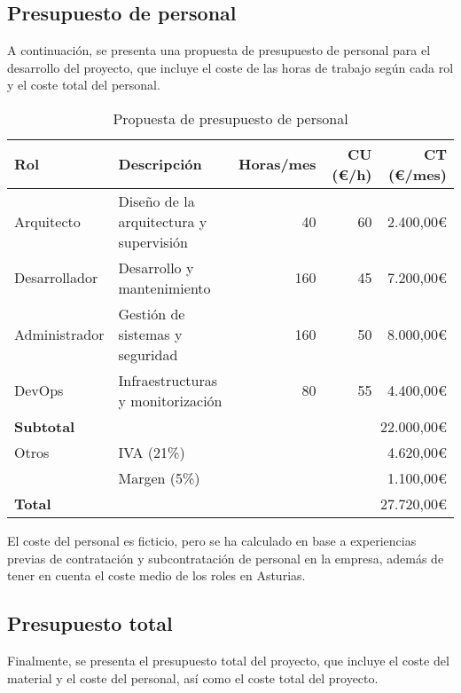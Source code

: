 \newpage{}
\subsection{Presupuesto de personal}\label{subsec:pres_personal}
A continuación, se presenta una propuesta de presupuesto de personal para el
desarrollo del proyecto, que incluye el coste de las horas de trabajo según
cada rol y el coste total del personal.

\begin{table}[H]
	\centering
	\small
	\begin{tabular}{|l|l|r|r|r|}
	\hline
	\textbf{Rol} & \textbf{Descripción} & \textbf{Horas/mes} & \textbf{CU (€/h)} & \textbf{CT (€/mes)} \\
	\hline
	\hline
	Arquitecto & Diseño de la arquitectura y supervisión & 40 & 60 & 2.400,00€ \\
	\hline
	Desarrollador & Desarrollo y mantenimiento & 160 & 45 & 7.200,00€ \\
	\hline
	Administrador & Gestión de sistemas y seguridad & 160 & 50 & 8.000,00€ \\
	\hline
	DevOps & Infraestructuras y monitorización & 80 & 55 & 4.400,00€ \\
	\hline
	\textbf{Subtotal} & \multicolumn{4}{r|}{22.000,00€} \\
	\hline
	\hline
	Otros & \multicolumn{3}{|l|}{IVA (21\%)} & 4.620,00€ \\
	 & \multicolumn{3}{|l|}{Margen (5\%)} & 1.100,00€ \\
	\hline
	\textbf{Total} & \multicolumn{4}{r|}{27.720,00€} \\
	\hline
	\end{tabular}
	\caption{Propuesta de presupuesto de personal}
	\label{tab:presupuesto_personal_aws}
\end{table}

El coste del personal es ficticio, pero se ha calculado en base a experiencias
previas de contratación y subcontratación de personal en la empresa, además de
tener en cuenta el coste medio de los roles en Asturias.

\subsection{Presupuesto total}\label{subsec:pres_total}
Finalmente, se presenta el presupuesto total del proyecto, que incluye el coste
del material y el coste del personal, así como el coste total del proyecto.

